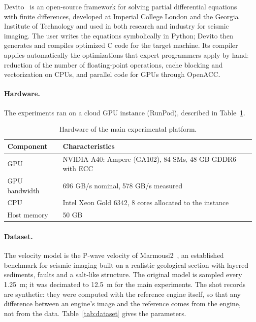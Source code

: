 \documentclass[letterpaper,11pt,leqno]{article}
\begin{document}
Devito~\citep{Louboutin2019Devito, Luporini2020Devito} is an open-source
framework for solving partial differential equations with finite differences,
developed at Imperial College London and the Georgia Institute of Technology
and used in both research and industry for seismic imaging. The user writes
the equations symbolically in Python; Devito then generates and compiles
optimized C code for the target machine. Its compiler applies automatically
the optimizations that expert programmers apply by hand: reduction of the
number of floating-point operations, cache blocking and vectorization on CPUs,
and parallel code for GPUs through OpenACC.

\paragraph{Hardware.}
The experiments ran on a cloud GPU instance (RunPod), described in
Table~\ref{tab:hardware}.

\begin{table}[htbp]
\centering
\caption{Hardware of the main experimental platform.}
\label{tab:hardware}
\begin{tabular}{ll}
\toprule
Component      & Characteristics \\
\midrule
GPU            & NVIDIA A40: Ampere (GA102), 84 SMs, 48 GB GDDR6 with ECC \\
GPU bandwidth  & 696 GB/s nominal, 578 GB/s measured \\
CPU            & Intel Xeon Gold 6342, 8 cores allocated to the instance \\
Host memory    & 50 GB \\
\bottomrule
\end{tabular}
\end{table}

\paragraph{Dataset.}
The velocity model is the P-wave velocity of Marmousi2~\citep{Martin2006Marmousi2},
an established benchmark for seismic imaging built on a realistic geological
section with layered sediments, faults and a salt-like structure. The original
model is sampled every 1.25~m; it was decimated to 12.5~m for the main
experiments. The shot records are synthetic: they were computed with the
reference engine itself, so that any difference between an engine's image and
the reference comes from the engine, not from the data.
Table~\ref{tab:dataset} gives the parameters.
\end{document}
